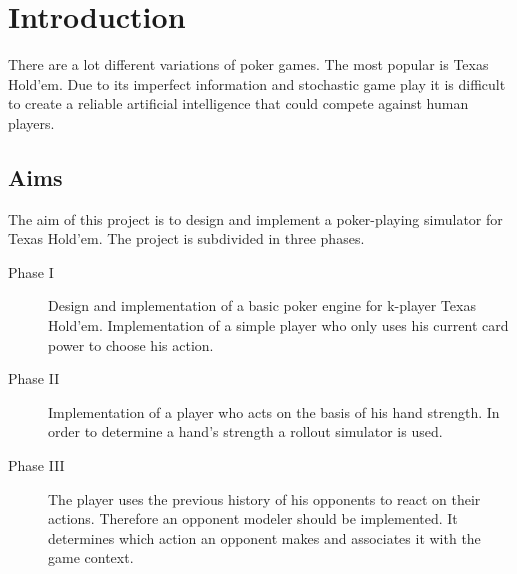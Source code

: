 \chapter{Introduction}
There are a lot different variations of poker games. The most popular is Texas Hold'em. Due to its imperfect information and stochastic game play it is difficult to create a reliable artificial intelligence that could compete against human players. 

\section{Aims}
The aim of this project is to design and implement a poker-playing simulator for Texas Hold'em. The project is subdivided in three phases.
\begin{description}
	\item[Phase I] Design and implementation of a basic poker engine for k-player Texas Hold'em. Implementation of a simple player who only uses his current card power to choose his action. 
	\item[Phase II] Implementation of a player who acts on the basis of his hand strength. In order to determine a hand's strength a rollout simulator is used.
	\item[Phase III] The player uses the previous history of his opponents to react on their actions. Therefore an opponent modeler should be implemented.  It determines which action an opponent makes and associates it with the game context.
\end{description}

